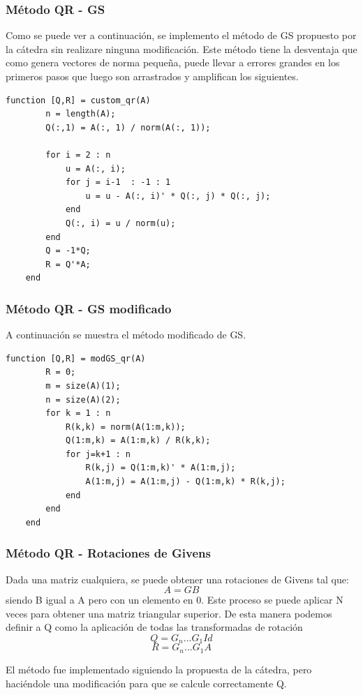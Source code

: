 \documentclass[a4paper,10pt,spanish]{article}
\begin{document}
\subsubsection{Método QR - GS}
Como se puede ver a continuación, se implemento el método de GS propuesto por la cátedra sin realizare ninguna modificación. Este método tiene la desventaja que como genera vectores de norma pequeña, puede llevar a errores grandes en los primeros pasos que luego son arrastrados y amplifican los siguientes.

\begin{lstlisting}[caption = Implementación de la descomposición QR con GS]
	function [Q,R] = custom_qr(A)
		n = length(A);
		Q(:,1) = A(:, 1) / norm(A(:, 1));

		for i = 2 : n
			u = A(:, i);
			for j = i-1  : -1 : 1
				u = u - A(:, i)' * Q(:, j) * Q(:, j);
			end
			Q(:, i) = u / norm(u);
		end
		Q = -1*Q;
		R = Q'*A;
	end
\end{lstlisting}
\subsubsection{Método QR - GS modificado}

A continuación se muestra el método modificado de GS.

\begin{lstlisting}[caption = Implementación de la descomposición QR con GS]
	function [Q,R] = modGS_qr(A)
		R = 0;
		m = size(A)(1);
		n = size(A)(2);
		for k = 1 : n
			R(k,k) = norm(A(1:m,k));
			Q(1:m,k) = A(1:m,k) / R(k,k);
			for j=k+1 : n
				R(k,j) = Q(1:m,k)' * A(1:m,j);
				A(1:m,j) = A(1:m,j) - Q(1:m,k) * R(k,j);
			end
		end
	end
\end{lstlisting}
\subsubsection{Método QR - Rotaciones de Givens}

Dada una matriz cualquiera, se puede obtener una rotaciones de Givens tal que: \[  A=G B  \] siendo B igual a A pero con un elemento en 0. Este proceso se puede aplicar N veces para obtener una matriz triangular superior.
De esta manera podemos definir a Q como la aplicación de todas las transformadas de rotación \[ Q = G_n ... G_1  Id  \] \[ R = G_n ... G_1  A  \]

El método fue implementado siguiendo la propuesta de la cátedra, pero haciéndole una modificación para que se calcule correctamente Q.
\end{document}
